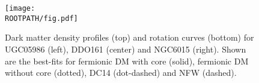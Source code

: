 \begin{figure}%
	\centering%
	\texttt{[image: \\ROOTPATH/fig.pdf]}%
	\caption{Dark matter density profiles (top) and rotation curves (bottom) for UGC05986 (left), DDO161 (center) and NGC6015 (right). Shown are the best-fits for fermionic DM with core (solid), fermionic DM without core (dotted), DC14 (dot-dashed) and NFW (dashed).}%
	\label{fig:benchmark:dark-matter-profiles}%
\end{figure}